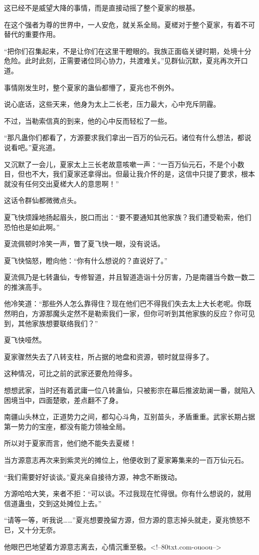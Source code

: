 \begin{this_body}
这已经不是威望大降的事情，而是直接动摇了整个夏家的根基。

在这个强者为尊的世界中，一人安危，就关系全局。夏槎对于整个夏家，有着不可替代的重要作用。

“把你们召集起来，不是让你们在这里干瞪眼的。我族正面临关键时期，处境十分危险。此时此刻，正需要诸位同心协力，共渡难关。”见群仙沉默，夏兆再次开口道。

事情刚发生时，整个夏家的蛊仙都懵了，夏兆也不例外。

说心底话，这些天来，他身为太上二长老，压力最大，心中充斥阴霾。

不过，当勒索信真的到来，他的心中反而轻松了一些。

“那凡蛊你们都看了，方源要求我们拿出一百万的仙元石。诸位有什么想法，都说说看吧。”夏兆道。

又沉默了一会儿，夏家太上三长老故意咳嗽一声：“一百万仙元石，不是个小数目，但也不大，我们夏家还拿得出。但最让我介怀的是，这信中只提了要求，根本就没有任何交出夏槎大人的意思啊！”

这话令群仙都微微点头。

夏飞快烦躁地扬起眉头，脱口而出：“要不要通知其他家族？我们遭受勒索，他们恐怕也是如此啊。”

夏流佩顿时冷笑一声，瞥了夏飞快一眼，没有说话。

夏飞快恼怒，瞪向他：“你有什么想说的？直说好了。”

夏流佩乃是七转蛊仙，专修智道，并且智道造诣十分厉害，乃是南疆当今数一数二的推演高手。

他冷笑道：“那些外人怎么靠得住？现在他们巴不得我们失去太上大长老呢。你既然明白，方源那魔头定然不是勒索我们一家，但你可听到其他家族的反应？你可见到，其他家族想要联络我们？”

夏飞快哑然。

夏家骤然失去了八转支柱，所占据的地盘和资源，顿时就显得多了。

这种情况，可比之前的武家还要危险得多。

想想武家，当时还有着武庸一位八转蛊仙，只被影宗在幕后推波助澜一番，就陷入困境当中，四面楚歌，差点翻不了身。

南疆山头林立，正道势力之间，都勾心斗角，互别苗头，矛盾重重。武家长期占据第一势力的宝座，都没有能力领袖全局。

所以对于夏家而言，他们绝不能失去夏槎！

当方源意志再次来到紫灵光的摊位上，他便收到了夏家筹集来的一百万仙元石。

“我们需要好好谈谈。”夏兆亲自接待方源，神念不断拨动。

方源哈哈大笑，来者不拒：“可以谈。不过我现在忙得很。你有什么想说的，就用信道蛊虫，交到这处摊位上去。”

“请等一等，听我说……”夏兆想要挽留方源，但方源的意志掉头就走，夏兆愤怒不已，又十分无奈。

他眼巴巴地望着方源意志离去，心情沉重至极。<!--80txt.com-ouoou-->

\end{this_body}

